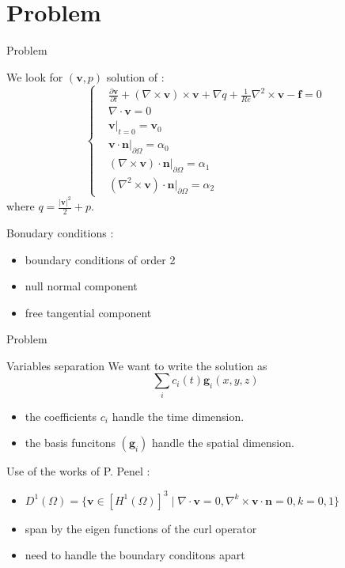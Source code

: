 \documentclass{beamer}
\newcommand{\grad}{{\nabla}}
\newcommand{\curl}{{\nabla\times}}
\newcommand{\curll}{{\nabla^2\times}}
\renewcommand{\div}{{\nabla\cdot}}
\newcommand{\restr}{{\big\rvert_{\partial\Omega}}}
\begin{document}
\section{Problem}
\begin{frame}{Problem}
\begin{block}{We look for $(\mathbf{v},p)$ solution of :}
\begin{equation}
\label{start}
\left\{\begin{aligned}
&\frac{\partial \mathbf{v}}{\partial t} + (\curl  \mathbf{v})\times \mathbf{v} + \grad q + \frac{1}{Re}\curll  \mathbf{v}-\mathbf{f} = 0\\
&\div \mathbf{v} = 0\\
&\mathbf{v}\big\rvert_{t=0} = \mathbf{v}_0\\
&\mathbf{v}\cdot \mathbf{n}\restr = \alpha_0\\
&(\curl  \mathbf{v})\cdot \mathbf{n}\restr = \alpha_1\\
&(\curll  \mathbf{v})\cdot \mathbf{n}\restr = \alpha_2
\end{aligned}\right.
\end{equation}
where $q = \frac{|\mathbf{v}|^2}{2}+p$.
\end{block}
Bonudary conditions :
\begin{itemize}
\item boundary conditions of order 2
\item null normal component
\item free tangential component
\end{itemize}
\end{frame}

\begin{frame}{Problem}
\begin{block}{Variables separation}
We want to write the solution as
\[ \sum_i c_i(t) \mathbf{g}_i(x,y,z) \]
\begin{itemize}
\item the coefficients $c_i$ handle the time dimension.
\item the basis funcitons $(\mathbf{g}_i)$ handle the spatial dimension.
\end{itemize}
\end{block}
Use of the works of P. Penel :
\begin{itemize}
\item $D^1(\Omega) = \{\mathbf{v} \in [H^1(\Omega)]^3\; |\; \div\mathbf{v}=0,\nabla^k\times \mathbf{v}\cdot \mathbf{n} = 0, k=0,1 \}$
\item span by the eigen functions of the curl operator
\item need to handle the boundary conditons apart
\end{itemize}
\end{frame}
\end{document}
